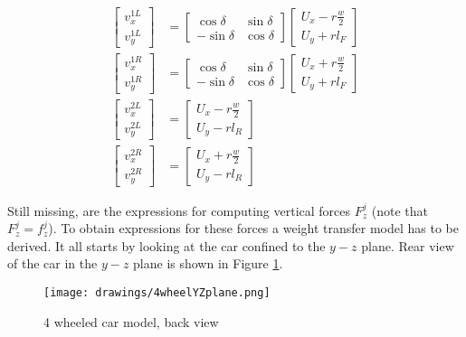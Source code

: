 \documentclass[paper=a4, fontsize=11pt]{scrartcl} %
\numberwithin{equation}{section} %
\numberwithin{figure}{section} %
\numberwithin{table}{section} %
\begin{document}
\begin{align}
\begin{bmatrix}
v^{1L}_x \\
v^{1L}_y
\end{bmatrix} & = \begin{bmatrix}
\cos\delta & \sin\delta \\
-\sin\delta & \cos\delta
\end{bmatrix} \begin{bmatrix}
U_x - r\frac{w}{2} \\
U_y + r l_F
\end{bmatrix} \\
\begin{bmatrix}
v^{1R}_x \\
v^{1R}_y
\end{bmatrix} & = \begin{bmatrix}
\cos\delta & \sin\delta \\
-\sin\delta & \cos\delta
\end{bmatrix} \begin{bmatrix}
U_x + r\frac{w}{2} \\
U_y + r l_F
\end{bmatrix} \\
\begin{bmatrix}
v^{2L}_x \\
v^{2L}_y
\end{bmatrix} & = \begin{bmatrix}
U_x - r\frac{w}{2} \\
U_y - r l_R
\end{bmatrix}\\
\begin{bmatrix}
v^{2R}_x \\
v^{2R}_y
\end{bmatrix} & = \begin{bmatrix}
U_x + r\frac{w}{2} \\
U_y - r l_R
\end{bmatrix}
\end{align}

Still missing, are the expressions for computing vertical forces $F^j_z$ (note that $F^j_z = f^j_z$). To obtain expressions for these forces a weight transfer model has to be derived. It all starts by looking at the car confined to the $y-z$ plane. Rear view of the car in the $y-z$ plane is shown in Figure \ref{4wheelYZplane}.

\begin{figure}[h!]
	\centering
	\texttt{[image: drawings/4wheelYZplane.png]}
	\caption{4 wheeled car model, back view}
	\label{4wheelYZplane}
\end{figure}
\end{document}
